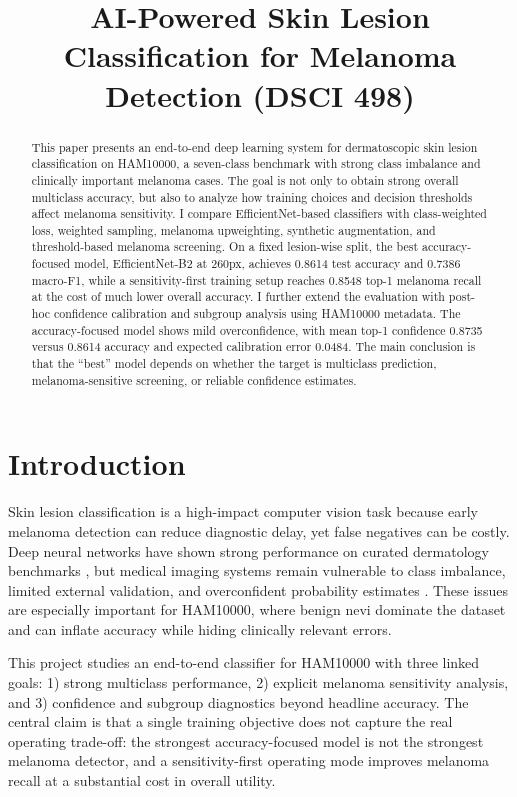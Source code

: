 \documentclass[conference]{IEEEtran}
\title{AI-Powered Skin Lesion Classification for Melanoma Detection (DSCI 498)}
\author{\IEEEauthorblockN{Yue Yu}}
\begin{document}
\maketitle

\begin{abstract}
This paper presents an end-to-end deep learning system for dermatoscopic skin lesion classification on HAM10000, a seven-class benchmark with strong class imbalance and clinically important melanoma cases. The goal is not only to obtain strong overall multiclass accuracy, but also to analyze how training choices and decision thresholds affect melanoma sensitivity. I compare EfficientNet-based classifiers with class-weighted loss, weighted sampling, melanoma upweighting, synthetic augmentation, and threshold-based melanoma screening. On a fixed lesion-wise split, the best accuracy-focused model, EfficientNet-B2 at 260px, achieves 0.8614 test accuracy and 0.7386 macro-F1, while a sensitivity-first training setup reaches 0.8548 top-1 melanoma recall at the cost of much lower overall accuracy. I further extend the evaluation with post-hoc confidence calibration and subgroup analysis using HAM10000 metadata. The accuracy-focused model shows mild overconfidence, with mean top-1 confidence 0.8735 versus 0.8614 accuracy and expected calibration error 0.0484. The main conclusion is that the ``best'' model depends on whether the target is multiclass prediction, melanoma-sensitive screening, or reliable confidence estimates.
\end{abstract}

\section{Introduction}
Skin lesion classification is a high-impact computer vision task because early melanoma detection can reduce diagnostic delay, yet false negatives can be costly. Deep neural networks have shown strong performance on curated dermatology benchmarks \cite{esteva2017dermatologist}, but medical imaging systems remain vulnerable to class imbalance, limited external validation, and overconfident probability estimates \cite{tschandl2018ham10000,melo2025systematic}. These issues are especially important for HAM10000, where benign nevi dominate the dataset and can inflate accuracy while hiding clinically relevant errors.

This project studies an end-to-end classifier for HAM10000 with three linked goals: 1) strong multiclass performance, 2) explicit melanoma sensitivity analysis, and 3) confidence and subgroup diagnostics beyond headline accuracy. The central claim is that a single training objective does not capture the real operating trade-off: the strongest accuracy-focused model is not the strongest melanoma detector, and a sensitivity-first operating mode improves melanoma recall at a substantial cost in overall utility.
\end{document}
